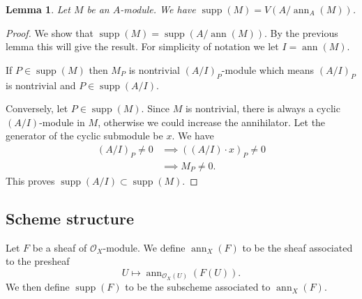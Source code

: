 \documentclass[12pt]{article}
\numberwithin{equation}{section}
\newtheorem{lemma}[theorem]{Lemma}
\theoremstyle{definition}
\theoremstyle{remark}
\newcommand{\ann}{\operatorname{ann}}
\newcommand{\Ocal}{\mathcal{O}}
\newcommand{\supp}{\operatorname{supp}}
\begin{document}
\begin{lemma}
	Let $M$ be an $A$-module. We have $\supp(M) = V(A/\ann_A(M))$.
\end{lemma}
\begin{proof}
	We show that $\supp(M)=\supp(A/\ann(M))$. 
	By the previous lemma this will give the result. 
	For simplicity of notation we let $I = \ann(M)$. 
	
	If $P\in \supp(M)$ then $M_P$ is nontrivial $(A/I)_P$-module which means $(A/I)_P$ is nontrivial and $P\in \supp(A/I)$. 
	
	Conversely, let $P\in \supp(M)$. 
	Since $M$ is nontrivial, there is always a cyclic $(A/I)$-module in $M$, otherwise we could increase the annihilator. 
	Let the generator of the cyclic submodule be $x$. 
	We have 
	\begin{align*}
	(A/I)_P \neq 0 &\implies ((A/I) \cdot x)_P \neq 0 \\
	&\implies M_P \neq 0. 
	\end{align*}
	This proves $\supp(A/I)\subset \supp(M)$. 
\end{proof}

\subsection{Scheme structure}
Let $F$ be a sheaf of $\Ocal_X$-module. 
We define $\ann_X(F)$ to be the sheaf associated to the presheaf 
$$ U\mapsto \ann_{\Ocal_X(U)}(F(U)).$$
We then define $\supp(F)$ to be the subscheme associated to $\ann_X(F)$.
\end{document}
